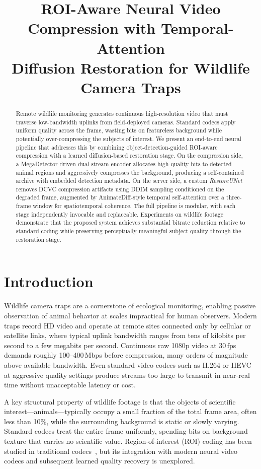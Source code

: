 \documentclass[10pt, conference]{IEEEtran}
\title{ROI-Aware Neural Video Compression with Temporal-Attention\\
Diffusion Restoration for Wildlife Camera Traps}
\author{%
  \IEEEauthorblockN{Mykhailo Sakevych}
  \IEEEauthorblockA{\textit{Department of Computer Science}\\
    \textit{Texas State University}\\
    San Marcos, TX 78666\\
    ukb12@txstate.edu}
  \and
  \IEEEauthorblockN{Vangelis Metsis}
  \IEEEauthorblockA{\textit{Department of Computer Science}\\
    \textit{Texas State University}\\
    San Marcos, TX 78666\\
    vmetsis@txstate.edu}
}
\begin{document}
\maketitle

\begin{abstract}
Remote wildlife monitoring generates continuous high-resolution video that must traverse low-bandwidth uplinks from field-deployed cameras. Standard codecs apply uniform quality across the frame, wasting bits on featureless background while potentially over-compressing the subjects of interest. We present an end-to-end neural pipeline that addresses this by combining object-detection-guided ROI-aware compression with a learned diffusion-based restoration stage. On the compression side, a MegaDetector-driven dual-stream encoder allocates high-quality bits to detected animal regions and aggressively compresses the background, producing a self-contained archive with embedded detection metadata. On the server side, a custom \emph{RestoreUNet} removes DCVC compression artifacts using DDIM sampling conditioned on the degraded frame, augmented by AnimateDiff-style temporal self-attention over a three-frame window for spatiotemporal coherence. The full pipeline is modular, with each stage independently invocable and replaceable. Experiments on wildlife footage demonstrate that the proposed system achieves substantial bitrate reduction relative to standard coding while preserving perceptually meaningful subject quality through the restoration stage.
\end{abstract}


\section{Introduction}

Wildlife camera traps are a cornerstone of ecological monitoring, enabling passive observation of animal behavior at scales impractical for human observers. Modern traps record HD video and operate at remote sites connected only by cellular or satellite links, where typical uplink bandwidth ranges from tens of kilobits per second to a few megabits per second. Continuous raw 1080p video at 30\,fps demands roughly 100--400\,Mbps before compression, many orders of magnitude above available bandwidth. Even standard video codecs such as H.264 or HEVC at aggressive quality settings produce streams too large to transmit in near-real time without unacceptable latency or cost.

A key structural property of wildlife footage is that the objects of scientific interest---animals---typically occupy a small fraction of the total frame area, often less than 10\%, while the surrounding background is static or slowly varying. Standard codecs treat the entire frame uniformly, spending bits on background texture that carries no scientific value. Region-of-interest (ROI) coding has been studied in traditional codecs~\cite{Hadizadeh_2014_ROI}, but its integration with modern neural video codecs and subsequent learned quality recovery is unexplored.
\end{document}
